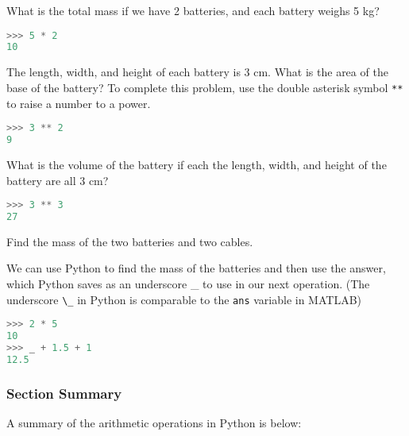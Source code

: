 \documentclass{book}
\newcommand{\passthrough}[1]{#1}
\begin{document}
What is the total mass if we have 2 batteries, and each battery weighs 5
kg?

\begin{lstlisting}[language=Python]
>>> 5 * 2
10
\end{lstlisting}

The length, width, and height of each battery is 3 cm. What is the area
of the base of the battery? To complete this problem, use the double
asterisk symbol \passthrough{\lstinline!**!} to raise a number to a
power.

\begin{lstlisting}[language=Python]
>>> 3 ** 2
9
\end{lstlisting}

What is the volume of the battery if each the length, width, and height
of the battery are all 3 cm?

\begin{lstlisting}[language=Python]
>>> 3 ** 3
27
\end{lstlisting}

Find the mass of the two batteries and two cables.

We can use Python to find the mass of the batteries and then use the
answer, which Python saves as an underscore \_ to use in our next
operation. (The underscore \passthrough{\lstinline!\_!} in Python is
comparable to the \passthrough{\lstinline!ans!} variable in MATLAB)

\begin{lstlisting}[language=Python]
>>> 2 * 5 
10
>>> _ + 1.5 + 1
12.5
\end{lstlisting}
    




    
        \hypertarget{section-summary}{%
\subsubsection{Section Summary}\label{section-summary}}

A summary of the arithmetic operations in Python is below:
\end{document}
